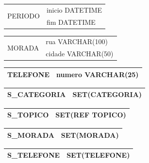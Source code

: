\documentclass[a4paper,12pt]{article}
\begin{document}
\begin{multicols}{2}
		\begin{tabular}{|c|l|} \hline
		\multirow{2}{*}{PERIODO}
		& inicio DATETIME \\
		& fim DATETIME \\ \hline 
		\end{tabular}
		
		\begin{tabular}{|c|l|} \hline
		\multirow{2}{*}{MORADA}
		& rua VARCHAR(100) \\
		& cidade VARCHAR(50) \\ \hline 
		\end{tabular}
		
		\begin{tabular}{|c|l|} \hline
		TELEFONE & numero VARCHAR(25) \\ \hline 
		\end{tabular}
		
		\begin{tabular}{|c|l|} \hline
		S\_CATEGORIA & SET(CATEGORIA) \\ \hline
		\end{tabular}
		
		\begin{tabular}{|c|l|} \hline
		S\_TOPICO & SET(REF TOPICO) \\ \hline
		\end{tabular}
		
		\begin{tabular}{|c|l|} \hline
		S\_MORADA & SET(MORADA) \\ \hline
		\end{tabular}
		
		\begin{tabular}{|c|l|} \hline
		S\_TELEFONE & SET(TELEFONE) \\ \hline
		\end{tabular}

	\end{multicols}
\end{document}
